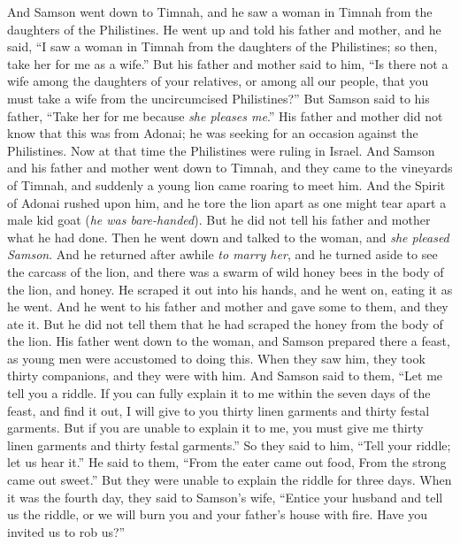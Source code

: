 \begin{biblechapter} %
 And Samson went down to Timnah, and he saw a woman in Timnah from the daughters of the Philistines.
\verse He went up and told his father and mother, and he said, “I saw a woman in Timnah from the daughters of the Philistines; so then, take her for me as a wife.”
\verse But his father and mother said to him, “Is there not a wife among the daughters of your relatives, or among all our people, that you must take a wife from the uncircumcised Philistines?” But Samson said to his father, “Take her for me because \textit{she pleases me}.”
\verse His father and mother did not know that this was from Adonai; he was seeking for an occasion against the Philistines. Now at that time the Philistines were ruling in Israel.
\verse And Samson and his father and mother went down to Timnah, and they came to the vineyards of Timnah, and suddenly a young lion came roaring to meet him.
\verse And the Spirit of Adonai rushed upon him, and he tore the lion apart as one might tear apart a male kid goat (\textit{he was bare-handed}). But he did not tell his father and mother what he had done.
\verse Then he went down and talked to the woman, and \textit{she pleased Samson}.
\verse And he returned after awhile \textit{to marry her}, and he turned aside to see the carcass of the lion, and there was a swarm of wild honey bees in the body of the lion, and honey.
\verse He scraped it out into his hands, and he went on, eating it as he went. And he went to his father and mother and gave some to them, and they ate it. But he did not tell them that he had scraped the honey from the body of the lion.
\verse His father went down to the woman, and Samson prepared there a feast, as young men were accustomed to doing this.
\verse When they saw him, they took thirty companions, and they were with him.
\verse And Samson said to them, “Let me tell you a riddle. If you can fully explain it to me within the seven days of the feast, and find it out, I will give to you thirty linen garments and thirty festal garments.
\verse But if you are unable to explain it to me, you must give me thirty linen garments and thirty festal garments.” So they said to him, “Tell your riddle; let us hear it.”
\verse He said to them, “From the eater came out food, 
From the strong came out sweet.” But they were unable to explain the riddle for three days.
\verse When it was the fourth day, they said to Samson’s wife, “Entice your husband and tell us the riddle, or we will burn you and your father’s house with fire. Have you invited us to rob us?”

\end{biblechapter}
